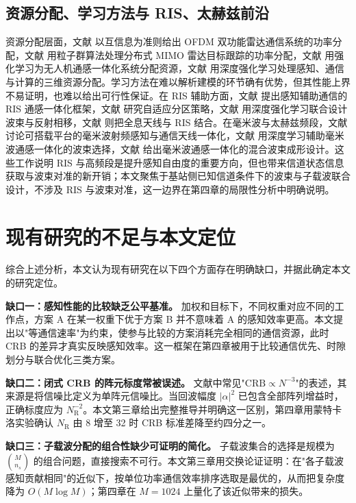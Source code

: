 \subsection{资源分配、学习方法与 RIS、太赫兹前沿}
资源分配层面，文献\cite{bekkali2023mutualinform} 以互信息为准则给出 OFDM 双功能雷达通信系统的功率分配，文献\cite{darzikolaei2022aneffectivep} 用粒子群算法处理分布式 MIMO 雷达目标跟踪的功率分配，文献\cite{wang2022reinforcemen} 用强化学习为无人机通感一体化系统分配资源，文献\cite{cai2024adeepreinfor} 用深度强化学习处理感知、通信与计算的三维资源分配。学习方法在难以解析建模的环节确有优势，但其性能上界不易证明，也难以给出可行性保证。在 RIS 辅助方面，文献\cite{yang2023reconfigurab} 提出感知辅助通信的 RIS 通感一体化框架，文献\cite{ilgy2026adaptivepart} 研究自适应分区策略，文献\cite{wang2025drlbasedrisa} 用深度强化学习联合设计波束与反射相移，文献\cite{nikmaleki2025leveragingho} 则把全息天线与 RIS 结合。在毫米波与太赫兹频段，文献\cite{koh2024antennainteg} 讨论可搭载平台的毫米波射频感知与通信天线一体化，文献\cite{chai2026deeplearning} 用深度学习辅助毫米波通感一体化的波束选择，文献\cite{han2026deeplearning} 给出毫米波通感一体化的混合波束成形设计。这些工作说明 RIS 与高频段是提升感知自由度的重要方向，但也带来信道状态信息获取与波束对准的新开销；本文聚焦于基站侧已知信道条件下的波束与子载波联合设计，不涉及 RIS 与波束对准，这一边界在第四章的局限性分析中明确说明。

\section{现有研究的不足与本文定位}
综合上述分析，本文认为现有研究在以下四个方面存在明确缺口，并据此确定本文的研究定位。

\textbf{缺口一：感知性能的比较缺乏公平基准。} 加权和目标下，不同权重对应不同的工作点，方案 A 在某一权重下优于方案 B 并不意味着 A 的感知效率更高。本文提出以"等通信速率"为约束，使参与比较的方案消耗完全相同的通信资源，此时 CRB 的差异才真实反映感知效率。这一框架在第四章被用于比较通信优先、时隙划分与联合优化三类方案。

\textbf{缺口二：闭式 CRB 的阵元标度常被误述。} 文献中常见"$\mathrm{CRB}\propto N^{-3}$"的表述，其来源是将信噪比定义为单阵元信噪比。当回波幅度 $\lvert\alpha\rvert^{2}$ 已包含全部阵列增益时，正确标度应为 $N_{\mathrm{R}}^{-2}$。本文第三章给出完整推导并明确这一区别，第四章用蒙特卡洛实验确认 $N_{\mathrm{R}}$ 由 8 增至 32 时 CRB 标准差降至约四分之一。

\textbf{缺口三：子载波分配的组合性缺少可证明的简化。} 子载波集合的选择是规模为 $\binom{M}{n_s}$ 的组合问题，直接搜索不可行。本文第三章用交换论证证明：在"各子载波感知贡献相同"的近似下，按单位功率通信效率排序选取是最优的，从而把复杂度降为 $O(M\log M)$；第四章在 $M = 1024$ 上量化了该近似带来的损失。

